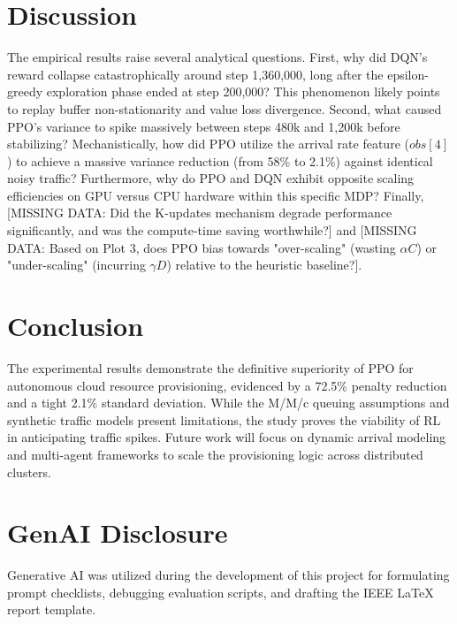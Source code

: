 \documentclass[conference]{IEEEtran}
\begin{document}
\section{Discussion}
The empirical results raise several analytical questions. First, why did DQN's reward collapse catastrophically around step 1,360,000, long after the epsilon-greedy exploration phase ended at step 200,000? This phenomenon likely points to replay buffer non-stationarity and value loss divergence. Second, what caused PPO's variance to spike massively between steps 480k and 1,200k before stabilizing? Mechanistically, how did PPO utilize the arrival rate feature ($obs[4]$) to achieve a massive variance reduction (from 58\% to 2.1\%) against identical noisy traffic? Furthermore, why do PPO and DQN exhibit opposite scaling efficiencies on GPU versus CPU hardware within this specific MDP? Finally, [MISSING DATA: Did the K-updates mechanism degrade performance significantly, and was the compute-time saving worthwhile?] and [MISSING DATA: Based on Plot 3, does PPO bias towards "over-scaling" (wasting $\alpha C$) or "under-scaling" (incurring $\gamma D$) relative to the heuristic baseline?].

\section{Conclusion}
The experimental results demonstrate the definitive superiority of PPO for autonomous cloud resource provisioning, evidenced by a 72.5\% penalty reduction and a tight 2.1\% standard deviation. While the M/M/c queuing assumptions and synthetic traffic models present limitations, the study proves the viability of RL in anticipating traffic spikes. Future work will focus on dynamic arrival modeling and multi-agent frameworks to scale the provisioning logic across distributed clusters.

\appendices
\section{GenAI Disclosure}
Generative AI was utilized during the development of this project for formulating prompt checklists, debugging evaluation scripts, and drafting the IEEE LaTeX report template.
\end{document}
